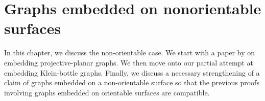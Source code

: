 \chapter{Graphs embedded on nonorientable surfaces}\label{chap:nonorientable}

In this chapter, we discuss the non-orientable case. We start with a paper by \textcite{nakamotoBookEmbeddingProjectiveplanar2015} on embedding projective-planar graphs. We then move onto our partial attempt at embedding Klein-bottle graphs. Finally, we discuss a necessary strengthening of a claim of graphs embedded on a non-orientable surface so that the previous proofs involving graphs embedded on orientable surfaces are compatible.







